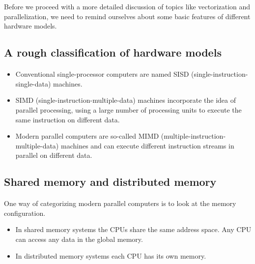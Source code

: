 \documentclass[%
oneside,                 %
final,                   %
10pt]{article}
\begin{document}
\noindent
Before we proceed with a more detailed discussion of topics like vectorization and parallelization, we need to remind ourselves about some basic features of different hardware models.



\subsection{A rough classification of hardware models}

\paragraph{}

\begin{itemize}
\item Conventional single-processor computers are named SISD (single-instruction-single-data) machines.

\item SIMD (single-instruction-multiple-data) machines incorporate the idea of parallel processing, using a large number of processing units to execute the same instruction on different data.

\item Modern parallel computers are so-called MIMD (multiple-instruction-multiple-data) machines and can execute different instruction streams in parallel on different data.
\end{itemize}

\noindent


\subsection{Shared memory and distributed memory}

\paragraph{}
One way of categorizing modern parallel computers is to look at the memory configuration.
\begin{itemize}
\item In shared memory systems the CPUs share the same address space. Any CPU can access any data in the global memory.

\item In distributed memory systems each CPU has its own memory.
\end{itemize}
\end{document}
